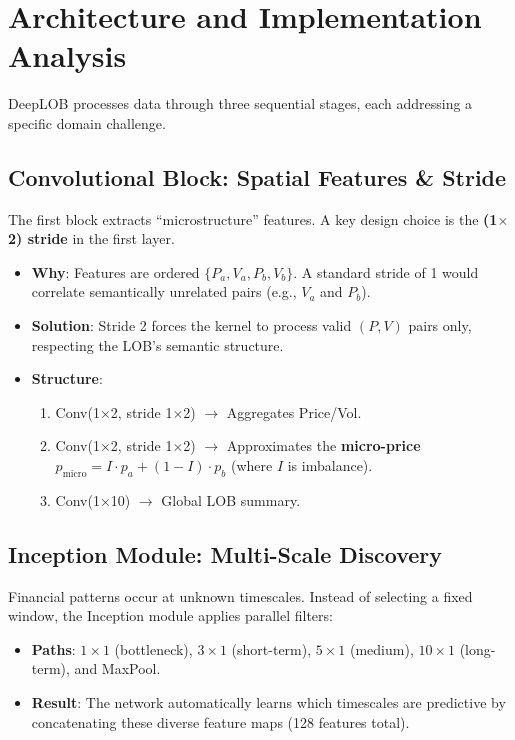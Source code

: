\documentclass[10pt]{article}
\begin{document}
\section{Architecture and Implementation Analysis}

DeepLOB processes data through three sequential stages, each addressing a specific domain challenge.

\subsection{Convolutional Block: Spatial Features \& Stride}
The first block extracts ``microstructure'' features. A key design choice is the \textbf{(1$\times$2) stride} in the first layer.
\begin{itemize}
    \item \textbf{Why}: Features are ordered $\{P_a, V_a, P_b, V_b\}$. A standard stride of 1 would correlate semantically unrelated pairs (e.g., $V_a$ and $P_b$).
    \item \textbf{Solution}: Stride 2 forces the kernel to process valid $(P, V)$ pairs only, respecting the LOB's semantic structure.
    \item \textbf{Structure}:
    \begin{enumerate}
        \item Conv(1$\times$2, stride 1$\times$2) $\rightarrow$ Aggregates Price/Vol.
        \item Conv(1$\times$2, stride 1$\times$2) $\rightarrow$ Approximates the \textbf{micro-price} $p_{\text{micro}} = I \cdot p_a + (1-I) \cdot p_b$ (where $I$ is imbalance).
        \item Conv(1$\times$10) $\rightarrow$ Global LOB summary.
    \end{enumerate}
\end{itemize}

\subsection{Inception Module: Multi-Scale Discovery}
Financial patterns occur at unknown timescales. Instead of selecting a fixed window, the Inception module applies parallel filters:
\begin{itemize}
    \item \textbf{Paths}: $1\times1$ (bottleneck), $3\times1$ (short-term), $5\times1$ (medium), $10\times1$ (long-term), and MaxPool.
    \item \textbf{Result}: The network automatically learns which timescales are predictive by concatenating these diverse feature maps (128 features total).
\end{itemize}
\end{document}
